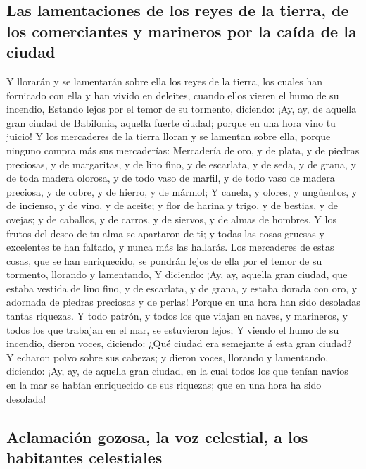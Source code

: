 \hypertarget{las-lamentaciones-de-los-reyes-de-la-tierra-de-los-comerciantes-y-marineros-por-la-cauxedda-de-la-ciudad}{%
\subsection{Las lamentaciones de los reyes de la tierra, de los
comerciantes y marineros por la caída de la
ciudad}\label{las-lamentaciones-de-los-reyes-de-la-tierra-de-los-comerciantes-y-marineros-por-la-cauxedda-de-la-ciudad}}

 Y llorarán y se lamentarán sobre ella los reyes de la
tierra, los cuales han fornicado con ella y han vivido en deleites,
cuando ellos vieren el humo de su incendio,  Estando
lejos por el temor de su tormento, diciendo: ¡Ay, ay, de aquella gran
ciudad de Babilonia, aquella fuerte ciudad; porque en una hora vino tu
juicio!  Y los mercaderes de la tierra lloran y se
lamentan sobre ella, porque ninguno compra más sus mercaderías:
 Mercadería de oro, y de plata, y de piedras preciosas, y
de margaritas, y de lino fino, y de escarlata, y de seda, y de grana, y
de toda madera olorosa, y de todo vaso de marfil, y de todo vaso de
madera preciosa, y de cobre, y de hierro, y de mármol;  Y
canela, y olores, y ungüentos, y de incienso, y de vino, y de aceite; y
flor de harina y trigo, y de bestias, y de ovejas; y de caballos, y de
carros, y de siervos, y de almas de hombres.  Y los
frutos del deseo de tu alma se apartaron de ti; y todas las cosas
gruesas y excelentes te han faltado, y nunca más las hallarás.
 Los mercaderes de estas cosas, que se han enriquecido,
se pondrán lejos de ella por el temor de su tormento, llorando y
lamentando,  Y diciendo: ¡Ay, ay, aquella gran ciudad,
que estaba vestida de lino fino, y de escarlata, y de grana, y estaba
dorada con oro, y adornada de piedras preciosas y de perlas!
 Porque en una hora han sido desoladas tantas riquezas. Y
todo patrón, y todos los que viajan en naves, y marineros, y todos los
que trabajan en el mar, se estuvieron lejos;  Y viendo el
humo de su incendio, dieron voces, diciendo: ¿Qué ciudad era semejante á
esta gran ciudad?  Y echaron polvo sobre sus cabezas; y
dieron voces, llorando y lamentando, diciendo: ¡Ay, ay, de aquella gran
ciudad, en la cual todos los que tenían navíos en la mar se habían
enriquecido de sus riquezas; que en una hora ha sido desolada!

\hypertarget{aclamaciuxf3n-gozosa-la-voz-celestial-a-los-habitantes-celestiales}{%
\subsection{Aclamación gozosa, la voz celestial, a los habitantes
celestiales}\label{aclamaciuxf3n-gozosa-la-voz-celestial-a-los-habitantes-celestiales}}

